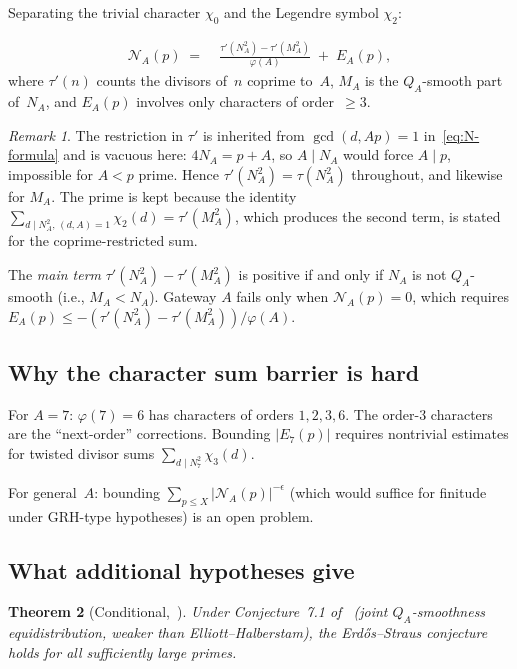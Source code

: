 \documentclass[12pt]{amsart}
\newtheorem{theorem}{Theorem}[section]
\theoremstyle{definition}
\theoremstyle{remark}
\newtheorem{remark}[theorem]{Remark}
\begin{document}
Separating the trivial character $\chi_0$ and the Legendre symbol $\chi_2$:

\begin{align}\label{eq:split}
  \mathcal{N}_A(p) \;=\;&
    \frac{\tau'(N_A^2) - \tau'(M_A^2)}{\varphi(A)}
    \;+\; E_A(p),
\end{align}
where $\tau'(n)$ counts the divisors of~$n$ coprime to~$A$,
$M_A$ is the $Q_A$-smooth part of~$N_A$, and
$E_A(p)$ involves only characters of order~$\ge 3$.

\begin{remark}
The restriction in $\tau'$ is inherited from $\gcd(d, Ap) = 1$
in~\eqref{eq:N-formula} and is vacuous here: $4 N_A = p + A$, so
$A \mid N_A$ would force $A \mid p$, impossible for $A < p$ prime.
Hence $\tau'(N_A^2) = \tau(N_A^2)$ throughout, and likewise for $M_A$.
The prime is kept because the identity $\sum_{d \mid N_A^2,\, (d,A) = 1}
\chi_2(d) = \tau'(M_A^2)$, which produces the second term, is stated for
the coprime-restricted sum.
\end{remark}

The \emph{main term} $\tau'(N_A^2) - \tau'(M_A^2)$ is positive if and
only if $N_A$ is not $Q_A$-smooth (i.e., $M_A < N_A$).
Gateway $A$ fails only when $\mathcal{N}_A(p) = 0$,
which requires $E_A(p) \le -(\tau'(N_A^2) - \tau'(M_A^2))/\varphi(A)$.

\subsection{Why the character sum barrier is hard}

For $A = 7$: $\varphi(7) = 6$ has characters of orders $1, 2, 3, 6$.
The order-$3$ characters are the ``next-order'' corrections.
Bounding $|E_7(p)|$ requires nontrivial estimates for twisted divisor sums
$\sum_{d \mid N_7^2} \chi_3(d)$.

For general~$A$: bounding $\sum_{p \le X} |\mathcal{N}_A(p)|^{-\epsilon}$
(which would suffice for finitude under GRH-type hypotheses) is
an open problem.

\subsection{What additional hypotheses give}

\begin{theorem}[Conditional,~{\cite[Theorem~7.2]{closure-paper}}]
Under Conjecture~7.1 of~\cite{closure-paper}
(joint $Q_A$-smoothness equidistribution, weaker than Elliott--Halberstam),
the Erd\H{o}s--Straus conjecture holds for all sufficiently large primes.
\end{theorem}
\end{document}
